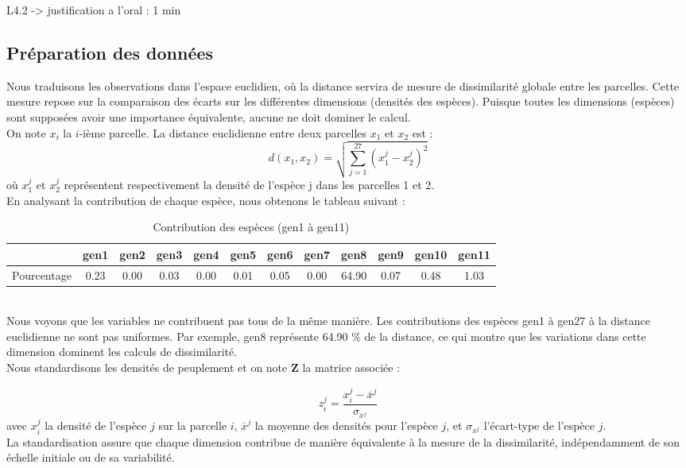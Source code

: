 \documentclass{article}
\begin{document}
L4.2 -> justification a l'oral : 1 min
\subsection{Préparation des données}
\label{Q1}
Nous traduisons les observations dans l’espace euclidien, où la distance servira de mesure de dissimilarité globale entre les parcelles. Cette mesure repose sur la comparaison des écarts sur les différentes dimensions (densités des espèces). Puisque toutes les dimensions (espèces) sont supposées avoir une importance équivalente, aucune ne doit dominer le calcul.
\\
On note $x_i$ la $i$-ième parcelle. La distance euclidienne entre deux parcelles $x_1$ et $x_2$ est :  
\[
d(x_1, x_2) = \sqrt{\sum_{j=1}^{27} (x_1^j - x_2^j)^2}
\]
où \( x_1^j \) et \( x_2^j \) représentent respectivement la densité de l'espèce j dans les parcelles 1 et 2.
\\
En analysant la contribution de chaque espèce, nous obtenons le tableau suivant :
\begin{table}[h!]
    \centering
    \caption{Contribution des espèces (gen1 à gen11)}
    \label{tab:pourcentage}
    \begin{tabular}{@{}l*{11}{c}@{}}
    \toprule
     & gen1 & gen2 & gen3 & gen4 & gen5 & gen6 & gen7 & gen8 & gen9 & gen10 & gen11 \\ 
    \midrule
    Pourcentage & 
    0.23 & 0.00 & 0.03 & 0.00 & 0.01 & 0.05 & 0.00 & 64.90 & 0.07 & 0.48 & 1.03 \\ 
    \bottomrule
    \end{tabular}
    \end{table}
\\
Nous voyons que les variables ne contribuent pas tous de la même manière. Les contributions des espèces gen1 à gen27 à la distance euclidienne ne sont pas uniformes. Par exemple, gen8 représente 64.90 \% de la distance, ce qui montre que les variations dans cette dimension dominent les calculs de dissimilarité.
\\
Nous standardisons les densités de peuplement et on note \( \mathbf{Z} \) la matrice associée :

\[
z_i^j = \frac{x_i^j - \overline{x}^j}{\sigma_{x^j}}
\]
avec \( x_i^j \) la densité de l’espèce \( j \) sur la parcelle \( i \), \( \overline{x}^j \) la moyenne des densités pour l’espèce \( j \), et \( \sigma_{x^j} \) l’écart-type de l’espèce \( j \).\\
La standardisation assure que chaque dimension contribue de manière équivalente à la mesure de la dissimilarité, indépendamment de son échelle initiale ou de sa variabilité.
\end{document}

